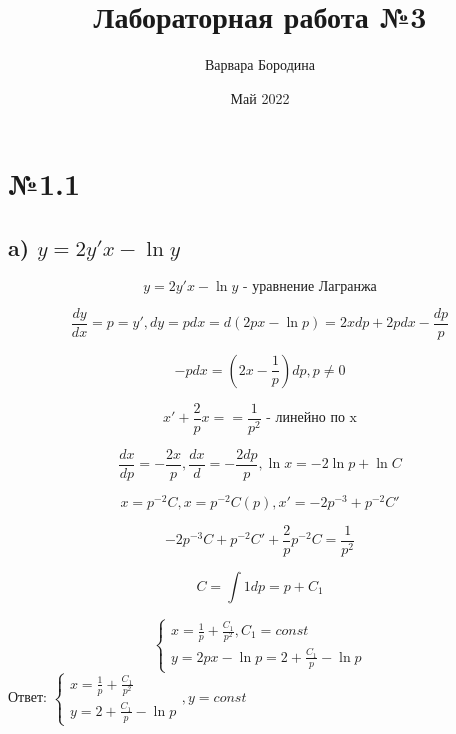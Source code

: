\documentclass{article}
\title{Лабораторная работа №3}
\author{Варвара Бородина}
\date{Май 2022}
\begin{document}
\maketitle

\section*{№1.1}
\subsection*{a) $ y = 2y'x - \ln{y}$}

\begin{equation*}
    y = 2y'x - \ln{y} \text{ - уравнение Лагранжа}
\end{equation*}

\begin{equation*}
    \frac{dy}{dx} = p = y', dy = pdx = d (2px - \ln{p}) = 2xdp + 2pdx - \frac{dp}{p}
\end{equation*}

\begin{equation*}
    -pdx = (2x - \frac{1}{p})dp , p \ne 0
\end{equation*}

\begin{equation*}
    x' + \frac{2}{p}x = = \frac{1}{p^2} \text{ - линейно по x}
\end{equation*}

\begin{equation*}
    \frac{dx}{dp} = -\frac{2x}{p}, \frac{dx}{d} = - \frac{2dp}{p}, \ln{x} = -2\ln{p} + \ln{C}
\end{equation*}

\begin{equation*}
    x = p^{-2}C, x = p^{-2}C(p), x' = -2p^{-3} + p^{-2}C'
\end{equation*}

\begin{equation*}
    -2p^{-3}C + p^{-2}C' + \frac{2}{p}p^{-2}C = \frac{1}{p^2}
\end{equation*}

\begin{equation*}
    C = \int{1dp} = p + C_1
\end{equation*}

\begin{equation*}
    \begin{cases}
    x = \frac{1}{p} +\frac{C_1}{p^2}, C_1 = const\\
    y = 2px - \ln{p} = 2 + \frac{C_1}{p} - \ln{p}
    \end{cases}
\end{equation*}
Ответ:
$
    \begin{cases}
     x = \frac{1}{p} +\frac{C_1}{p^2}\\
    y = 2 + \frac{C_1}{p} - \ln{p}
    \end{cases}, y = const
$
\end{document}

